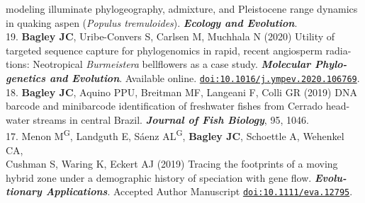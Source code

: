 \documentclass[margin,line]{res}
\begin{document}
\begin{resume}
\hspace*{8mm} modeling illuminate phylogeography, admixture, and Pleistocene range dynamics\\ \vspace{2mm}
\hspace*{8mm}in quaking aspen (\textit{Populus tremuloides}). {\it \textbf{Ecology and Evolution}}.\\
19. \textbf{Bagley JC}, Uribe-Convers S, Carlsen M, Muchhala N (2020) Utility of\\
\hspace*{8mm} targeted sequence capture for phylogenomics in rapid, recent angiosperm radia-\\
\hspace*{8mm} tions: Neotropical \emph{Burmeistera} bellflowers as a case study. \textit{\textbf{Molecular Phylo-}\\ \vspace{2mm}
\hspace*{8mm}\textbf{genetics and Evolution}}. Available online. \href{doi:10.1016/j.ympev.2020.106769}{\tt doi:10.1016/j.ympev.2020.106769}.\\
18. \textbf{Bagley JC}, Aquino PPU, Breitman MF, Langeani F, Colli GR (2019) DNA\\
\hspace*{8mm} barcode and minibarcode identification of freshwater fishes from Cerrado head-\\ \vspace{2mm}
\hspace*{8mm}water streams in central Brazil. \textit{\textbf{Journal of Fish Biology}}, 95, 1046. \\
17. Menon M\textsuperscript{G}, Landguth E, S\'{a}enz AL\textsuperscript{G}, \textbf{Bagley JC}, Schoettle A, Wehenkel CA,\\ 
\hspace*{8mm} Cushman S, Waring K, Eckert AJ (2019) Tracing the footprints of a moving \\
\hspace*{8mm} hybrid zone under a demographic history of speciation with gene flow. \textit{\textbf{Evolu-}\\ \vspace{2mm}
\hspace*{8mm}\textbf{tionary Applications}}. Accepted Author Manuscript \href{doi:10.1111/eva.12795}{\tt doi:10.1111/eva.12795}.\\

\end{resume}
\end{document}
